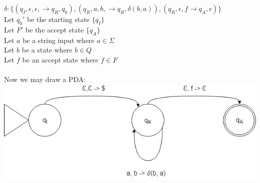 \documentclass[12pt]{article}
\begin{document}
$\delta : \{(q_I, \epsilon, \epsilon, \rightarrow q_R, q_0), (q_R, a, b, \rightarrow q_R, \delta(b, a)), (q_R, \epsilon, f \rightarrow q_A, \epsilon) \}$ \\
Let $q_0'$ be the starting state $\{q_I\}$ \\
Let $F'$ be the accept state $\{q_A\}$ \\
Let $a$ be a string input where $a \in \Sigma$ \\
Let $b$ be a state where $b \in Q$ \\
Let $f$ be an accept state where $f \in F$ \\\\

Now we may draw a PDA:\\

\includegraphics[width=\textwidth]{q5}
\end{document}
